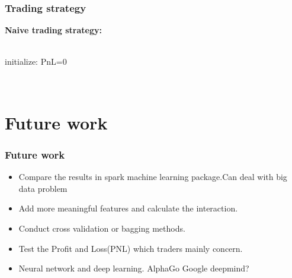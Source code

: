 \documentclass[xcolor={x11names,svgnames,dvipsnames}]{beamer}
\begin{document}
\begin{frame}
\frametitle{Trading strategy}
		\textbf{Naive trading strategy:}\\
\\
		\begin{algorithm}[H]
				         		    \dontprintsemicolon
				         		    \linesnumbered
				         		    \nl initialize: PnL=0\\				         		    
				         		    \nl {}				         		    				         		    
				         		    
			\end{algorithm} \\

\end{frame}


\section{Future work}
\begin{frame}
\frametitle{Future work}
    \begin{itemize}
        \item  Compare the results in spark machine learning package.Can deal with big data problem 
        \item  Add more meaningful features and calculate the interaction.
        \item  Conduct cross validation or bagging methods.
        \item  Test the Profit and Loss(PNL) which traders mainly concern.
        \item  Neural network and deep learning.  AlphaGo Google deepmind? 
      \end{itemize}
\end{frame}
\end{document}
